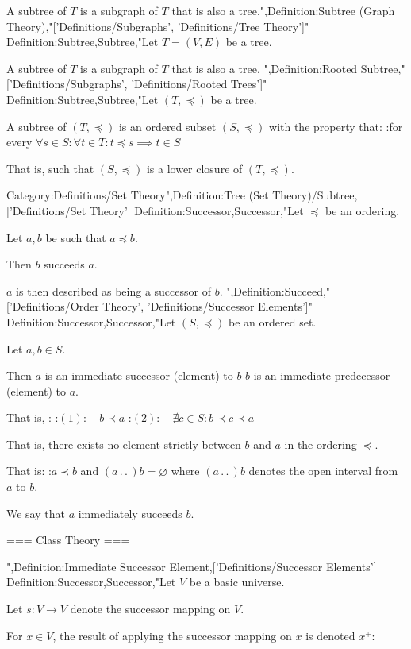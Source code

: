 A subtree of $T$ is a subgraph of $T$ that is also a tree.",Definition:Subtree (Graph Theory),"['Definitions/Subgraphs', 'Definitions/Tree Theory']"
Definition:Subtree,Subtree,"Let $T = \left( V, E \right)$ be a tree.


A subtree of $T$ is a subgraph of $T$ that is also a tree.
",Definition:Rooted Subtree,"['Definitions/Subgraphs', 'Definitions/Rooted Trees']"
Definition:Subtree,Subtree,"Let $\left( T, \preceq \right)$ be a tree.

A subtree of $\left( T, \preceq \right)$ is an ordered subset $\left( S, \preceq \right)$ with the property that:
:for every $\forall s \in S: \forall t \in T: t \preceq s \implies t \in S$

That is, such that $\left( S, \preceq \right)$ is a lower closure of $\left( T, \preceq \right)$.


Category:Definitions/Set Theory",Definition:Tree (Set Theory)/Subtree,['Definitions/Set Theory']
Definition:Successor,Successor,"Let $\preceq$ be an ordering.

Let $a, b$ be such that $a \preceq b$.


Then $b$ succeeds $a$.

$a$ is then described as being a successor of $b$.
",Definition:Succeed,"['Definitions/Order Theory', 'Definitions/Successor Elements']"
Definition:Successor,Successor,"Let $\left( S, \preceq \right)$ be an ordered set.

Let $a, b \in S$.


Then $a$ is an immediate successor (element) to $b$  $b$ is an immediate predecessor (element) to $a$.

That is, :
:$(1): \quad b \prec a$
:$(2): \quad \nexists c \in S: b \prec c \prec a$

That is, there exists no element strictly between $b$ and $a$ in the ordering $\preceq$.

That is:
:$a \prec b$ and $\left( a \,.\,.\,   \right)b = \varnothing$
where $\left( a \,.\,.\,   \right)b$ denotes the open interval from $a$ to $b$.


We say that $a$ immediately succeeds $b$.


=== Class Theory ===

",Definition:Immediate Successor Element,['Definitions/Successor Elements']
Definition:Successor,Successor,"Let $V$ be a basic universe.

Let $s: V \to V$ denote the successor mapping on $V$.


For $x \in V$, the result of applying the successor mapping on $x$ is denoted $x^+$:


